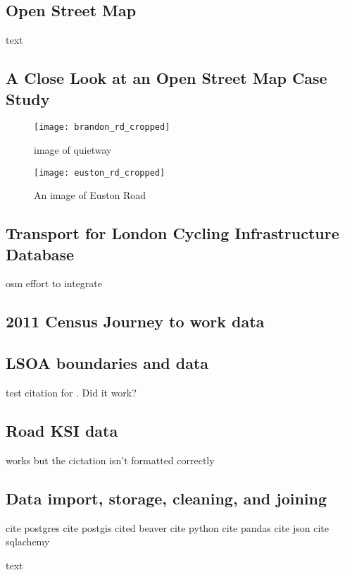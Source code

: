 \subsection{Open Street Map}

text

\cite{osm}

\subsection{A Close Look at an Open Street Map Case Study}

\begin{figure}
\centering
\texttt{[image: brandon\_rd\_cropped]}
\caption{image of quietway}
\end{figure}

\begin{figure}
\centering
\texttt{[image: euston\_rd\_cropped]}
\caption{An image of Euston Road}
\label{fig:euston}
\end{figure}

\subsection{Transport for London Cycling Infrastructure Database}

\cite{tflcid}

osm effort to integrate

\subsection{2011 Census Journey to work data}



\cite{jtw}

\subsection{LSOA boundaries and data}
	
test citation for \cite{lsoageoms}. Did it work?
	
\subsection{Road KSI data}
	
	
	works but the cictation isn't formatted correctly
	\cite{cyclistksi}
	
\subsection{Data import, storage, cleaning, and joining}

cite postgres
cite postgis
cited beaver
cite python
cite pandas
cite json
cite sqlachemy

text